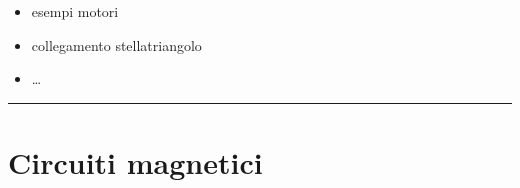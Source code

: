 \documentclass[letterpaper,10pt,italian]{jupyterBook}
\begin{document}
\sphinxAtStartPar
{}
\begin{itemize}
\item {} 
\sphinxAtStartPar
esempi motori

\item {} 
\sphinxAtStartPar
collegamento stella\sphinxhyphen{}triangolo

\item {} 
\sphinxAtStartPar
…

\end{itemize}




\bigskip\hrule\bigskip


\sphinxstepscope


\section{Circuiti magnetici}
\label{\detokenize{ch/electromagnetism/circuits-magnetic:circuiti-magnetici}}\label{\detokenize{ch/electromagnetism/circuits-magnetic:physics-hs-electromagnetism-circuits-magnetic}}\label{\detokenize{ch/electromagnetism/circuits-magnetic::doc}}
\end{document}
